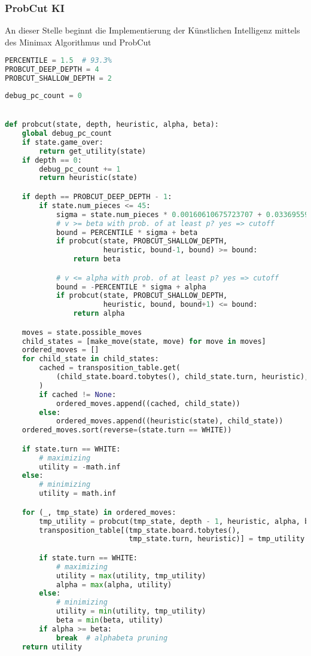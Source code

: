 \hypertarget{probcut-ki}{%
\subsubsection{ProbCut KI}\label{probcut-ki}}

An dieser Stelle beginnt die Implementierung der Künstlichen Intelligenz
mittels des Minimax Algorithmus und ProbCut

\begin{lstlisting}[language=Python]
PERCENTILE = 1.5  # 93.3%
PROBCUT_DEEP_DEPTH = 4
PROBCUT_SHALLOW_DEPTH = 2
\end{lstlisting}

\begin{lstlisting}[language=Python]
debug_pc_count = 0


def probcut(state, depth, heuristic, alpha, beta):
    global debug_pc_count
    if state.game_over:
        return get_utility(state)
    if depth == 0:
        debug_pc_count += 1
        return heuristic(state)

    if depth == PROBCUT_DEEP_DEPTH - 1:
        if state.num_pieces <= 45:
            sigma = state.num_pieces * 0.00160610675723707 + 0.03369559303029926
            # v >= beta with prob. of at least p? yes => cutoff
            bound = PERCENTILE * sigma + beta
            if probcut(state, PROBCUT_SHALLOW_DEPTH,
                       heuristic, bound-1, bound) >= bound:
                return beta

            # v <= alpha with prob. of at least p? yes => cutoff
            bound = -PERCENTILE * sigma + alpha
            if probcut(state, PROBCUT_SHALLOW_DEPTH,
                       heuristic, bound, bound+1) <= bound:
                return alpha

    moves = state.possible_moves
    child_states = [make_move(state, move) for move in moves]
    ordered_moves = []
    for child_state in child_states:
        cached = transposition_table.get(
            (child_state.board.tobytes(), child_state.turn, heuristic), None
        )
        if cached != None:
            ordered_moves.append((cached, child_state))
        else:
            ordered_moves.append((heuristic(state), child_state))
    ordered_moves.sort(reverse=(state.turn == WHITE))

    if state.turn == WHITE:
        # maximizing
        utility = -math.inf
    else:
        # minimizing
        utility = math.inf

    for (_, tmp_state) in ordered_moves:
        tmp_utility = probcut(tmp_state, depth - 1, heuristic, alpha, beta)
        transposition_table[(tmp_state.board.tobytes(),
                             tmp_state.turn, heuristic)] = tmp_utility

        if state.turn == WHITE:
            # maximizing
            utility = max(utility, tmp_utility)
            alpha = max(alpha, utility)
        else:
            # minimizing
            utility = min(utility, tmp_utility)
            beta = min(beta, utility)
        if alpha >= beta:
            break  # alphabeta pruning
    return utility
\end{lstlisting}

